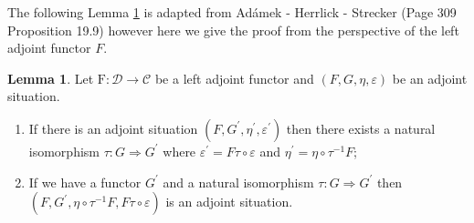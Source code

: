 \documentclass[11pt,a4paper]{article}
\theoremstyle{definition}
\newtheorem{lemma}[thm]{Lemma}
\newcommand\cat[1]{\mathscr{#1}}
\newcommand\func[3]{\mathrm{#1}\colon#2\rightarrow#3}
\newcommand\nattran[3]{#1\colon#2\Rightarrow#3}
\numberwithin{equation}{section}
\begin{document}
The following Lemma \ref{lem:adjsituniiso} is adapted from Adámek - Herrlick - Strecker \cite{ACC} (Page 309 Proposition 19.9) however here we give the proof from the perspective of the left adjoint functor $F$.
\begin{lemma}
    \label{lem:adjsituniiso}
    Let $\func{F}{\cat{D}}{\cat{C}}$ be a left adjoint functor and $(F,G,\eta,\varepsilon)$ be an adjoint situation. 
    \begin{enumerate}
    \item If there is an adjoint situation $(F,G^\prime,\eta^\prime,\varepsilon^\prime)$ then there exists a natural isomorphism $\nattran{\tau}{G}{G^\prime}$ where $\varepsilon^\prime = F\tau \circ \varepsilon$ and $\eta^\prime = \eta\circ\tau^{-1}F$;
    \item If we have a functor $G^\prime$ and a natural isomorphism $\nattran{\tau}{G}{G^\prime}$ then $(F,G^\prime,\eta\circ\tau^{-1}F,F\tau\circ\varepsilon)$ is an adjoint situation.
    \end{enumerate}
\end{lemma}
\end{document}
